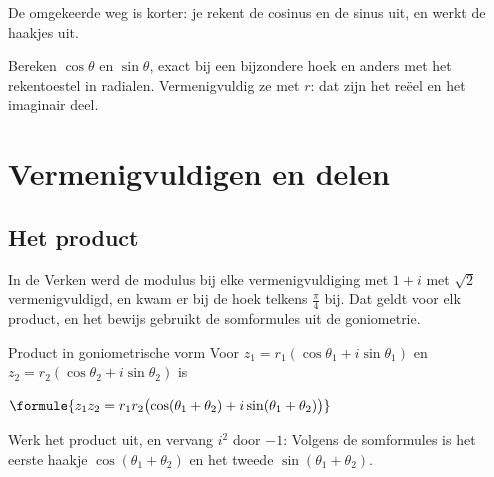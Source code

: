 De omgekeerde weg is korter: je rekent de cosinus en de sinus uit, en werkt de haakjes uit.


\begin{werkwijze}
Bereken $\cos\theta$ en $\sin\theta$, exact bij een bijzondere hoek en anders met het rekentoestel in radialen. Vermenigvuldig ze met $r$: dat zijn het reëel en het imaginair deel.
\end{werkwijze}

\begin{oefeningen}
\end{oefeningen}

\section{Vermenigvuldigen en delen}

\subsection{Het product}

In de Verken werd de modulus bij elke vermenigvuldiging met $1 + i$ met $\sqrt2$ vermenigvuldigd, en kwam er bij de hoek telkens $\frac{\pi}{4}$ bij. Dat geldt voor elk product, en het bewijs gebruikt de somformules uit de goniometrie.

\begin{theorie}
\begin{stelling}{Product in goniometrische vorm}
Voor $z_1 = r_1(\cos\theta_1 + i\sin\theta_1)$ en $z_2 = r_2(\cos\theta_2 + i\sin\theta_2)$ is

\vspace{1mm}
\qquad $\formule{z_1 z_2 = r_1 r_2 \bigl(\cos(\theta_1 + \theta_2) + i\sin(\theta_1 + \theta_2)\bigr)}$
\end{stelling}

\begin{bewijs}
Werk het product uit, en vervang $i^2$ door $-1$:
Volgens de somformules is het eerste haakje $\cos(\theta_1 + \theta_2)$ en het tweede $\sin(\theta_1 + \theta_2)$.
\end{bewijs}
\end{theorie}

